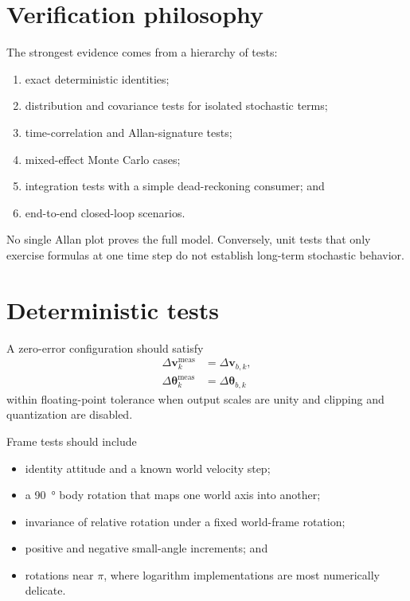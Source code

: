 \documentclass[11pt,oneside,headings=big]{scrreprt}
\newcommand{\vect}[1]{\bm{#1}}
\begin{document}
    \section{Verification philosophy}
    The strongest evidence comes from a hierarchy of tests:
    \begin{enumerate}
        \item exact deterministic identities;
        \item distribution and covariance tests for isolated stochastic terms;
        \item time-correlation and Allan-signature tests;
        \item mixed-effect Monte Carlo cases;
        \item integration tests with a simple dead-reckoning consumer; and
        \item end-to-end closed-loop scenarios.
    \end{enumerate}
    No single Allan plot proves the full model. Conversely, unit tests that only
    exercise formulas at one time step do not establish long-term stochastic
    behavior.


    \section{Deterministic tests}
    A zero-error configuration should satisfy
    \begin{align}
        \Delta\vect v^{\mathrm{meas}}_k&=\Delta\vect v_{b,k},\\
        \Delta\vect\theta^{\mathrm{meas}}_k&=\Delta\vect\theta_{b,k}
        \label{eq:zero-error-identity}
    \end{align}
    within floating-point tolerance when output scales are unity and clipping and
    quantization are disabled.

    Frame tests should include
    \begin{itemize}
        \item identity attitude and a known world velocity step;
        \item a \SI{90}{\degree} body rotation that maps one world axis into another;
        \item invariance of relative rotation under a fixed world-frame rotation;
        \item positive and negative small-angle increments; and
        \item rotations near \(\pi\), where logarithm implementations are most
        numerically delicate.
    \end{itemize}
\end{document}
